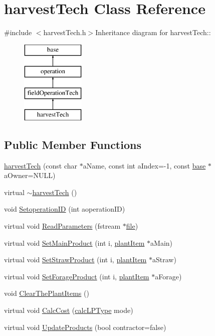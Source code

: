 \hypertarget{classharvest_tech}{
\section{harvestTech Class Reference}
\label{classharvest_tech}
}


{\ttfamily \#include $<$harvestTech.h$>$}Inheritance diagram for harvestTech::\begin{figure}[H]
\begin{center}
\leavevmode
\includegraphics[height=4cm]{classharvest_tech}
\end{center}
\end{figure}
\subsection*{Public Member Functions}
\begin{DoxyCompactItemize}
\item 
\hyperlink{classharvest_tech_a219b924c7e1e1224f72f62eebc973d4c}{harvestTech} (const char $\ast$aName, const int aIndex=-\/1, const \hyperlink{classbase}{base} $\ast$aOwner=NULL)
\item 
virtual \hyperlink{classharvest_tech_a37b6681330c9b3d7edd5480f8c68cd66}{$\sim$harvestTech} ()
\item 
void \hyperlink{classharvest_tech_ae5e426c9daf76eb383bc475c15dd069f}{SetoperationID} (int aoperationID)
\item 
virtual void \hyperlink{classharvest_tech_a8b2a5efa11d4ee3355c75cec9a080b27}{ReadParameters} (fstream $\ast$\hyperlink{classbase_a3af52ee9891719d09b8b19b42450b6f6}{file})
\item 
virtual void \hyperlink{classharvest_tech_a08dcfb181357050af56db22695c5c90e}{SetMainProduct} (int i, \hyperlink{classplant_item}{plantItem} $\ast$aMain)
\item 
virtual void \hyperlink{classharvest_tech_ada5009f15cedc20583c711df035af86f}{SetStrawProduct} (int i, \hyperlink{classplant_item}{plantItem} $\ast$aStraw)
\item 
virtual void \hyperlink{classharvest_tech_a4e255e621cdcd9c4c1ce3a01fad834b7}{SetForageProduct} (int i, \hyperlink{classplant_item}{plantItem} $\ast$aForage)
\item 
void \hyperlink{classharvest_tech_ab48c8055972115e18263492081374a09}{ClearThePlantItems} ()
\item 
virtual void \hyperlink{classharvest_tech_a9cbac27e3242c6ac08e0cbcebfdb13b3}{CalcCost} (\hyperlink{typer_8h_af05cf854fc14086a0d6404be5ae9813f}{calcLPType} mode)
\item 
virtual void \hyperlink{classharvest_tech_a80aa806fd5fa0f652b8ead63fb8976a4}{UpdateProducts} (bool contractor=false)
\end{DoxyCompactItemize}
